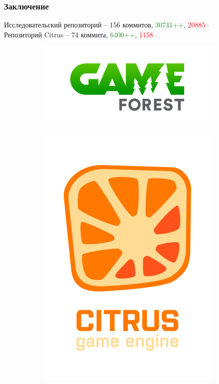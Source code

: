 \documentclass[10pt, unicode]{beamer}
\begin{document}
    \begin{frame}
        \frametitle{Заключение}
        Исследовательский репозиторий -- 156 коммитов, \textcolor{ForestGreen}{30741++}, \textcolor{red}{20885--}\\
        Репозиторий Citrus -- 74 коммита, \textcolor{ForestGreen}{6400++}, \textcolor{red}{1158--}
        \begin{figure}[H]
            \centering
            \begin{subfigure}{0.49\linewidth}
                \centering
                \includegraphics[scale=0.2]{GF.png}
            \end{subfigure}
            \begin{subfigure}{0.49\linewidth}
                \centering
                \includegraphics[scale=0.2]{Citrus.png}
            \end{subfigure}
        \end{figure}
    \end{frame}
\end{document}
